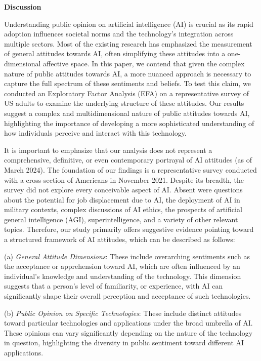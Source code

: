 \textbf{Discussion}

Understanding public opinion on artificial intelligence (AI) is crucial as its rapid adoption influences societal norms and the technology's integration across multiple sectors. Most of the existing research has emphasized the measurement of general attitudes towards AI, often simplifying these attitudes into a one-dimensional affective space. In this paper, we contend that given the complex nature of public attitudes towards AI, a more nuanced approach is necessary to capture the full spectrum of these sentiments and beliefs. To test this claim, we conducted an Exploratory Factor Analysis (EFA) on a representative survey of US adults to examine the underlying structure of these attitudes. Our results suggest a complex and multidimensional nature of public attitudes towards AI, highlighting the importance of developing a more sophisticated understanding of how individuals perceive and interact with this technology.

It is important to emphasize that our analysis does not represent a comprehensive, definitive, or even contemporary portrayal of AI attitudes (as of March 2024). The foundation of our findings is a representative survey conducted with a cross-section of Americans in November 2021. Despite its breadth, the survey did not explore every conceivable aspect of AI. Absent were questions about the potential for job displacement due to AI, the deployment of AI in military contexts, complex discussions of AI ethics, the prospects of artificial general intelligence (AGI), superintelligence, and a variety of other relevant topics. Therefore, our study primarily offers suggestive evidence pointing toward a structured framework of AI attitudes, which can be described as follows:

(a) \textit{General Attitude Dimensions}: These include overarching sentiments such as the acceptance or apprehension toward AI, which are often influenced by an individual's knowledge and understanding of the technology. This dimension suggests that a person's level of familiarity, or experience, with AI can significantly shape their overall perception and acceptance of such technologies.

(b) \textit{Public Opinion on Specific Technologies}: These include distinct attitudes toward particular technologies and applications under the broad umbrella of AI. These opinions can vary significantly depending on the nature of the technology in question, highlighting the diversity in public sentiment toward different AI applications.

